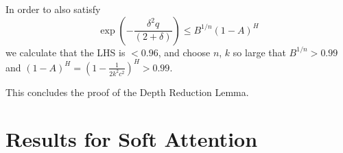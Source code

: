 \documentclass[11pt,a4paper]{article}
\begin{document}
In order to also satisfy
\begin{equation}
\exp\left(-\frac{\delta^2q}{(2+\delta)}\right)  \leq B^{1/n} (1-A)^H
\end{equation}
we calculate that the LHS is $<0.96$, and choose $n$, $k$ so large that $B^{1/n} > 0.99$ and $(1-A)^H = (1-\frac{1}{2k^2c^2})^H > 0.99$.

This concludes the proof of the Depth Reduction Lemma.





\section{Results for Soft Attention}


\end{document}
